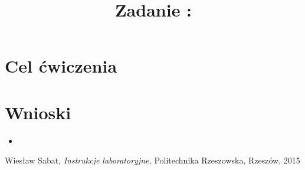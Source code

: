 \documentclass{classrep}
\author{
  \studentinfo{Witold Olechowski}{127517} \and
  \studentinfo{Grzegorz Pelczar}{125242} \and
  \studentinfo{Mateusz Kut}{125212} \and
  \studentinfo{Tomasz Marecik}{127374} 
}
\title{Zadanie : }
\begin{document}
\maketitle

\section{Cel ćwiczenia}

\section{Wnioski}
\begin{itemize}
	\item 
\end{itemize}

\begin{thebibliography}{0}
    Wiesław Sabat,
    \textsl{Instrukcje laboratoryjne,} Politechnika Rzeszowska, Rzeszów, 2015
\end{thebibliography}
\end{document}
